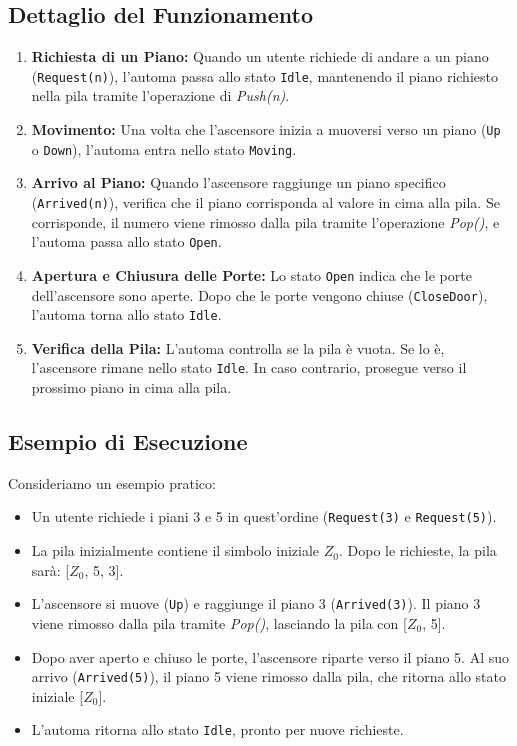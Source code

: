 \documentclass[a4paper,12pt]{report}
\begin{document}
\subsection*{Dettaglio del Funzionamento}
\begin{enumerate}
    \item \textbf{Richiesta di un Piano:} Quando un utente richiede di andare a un piano (\texttt{Request(n)}), l'automa passa allo stato \texttt{Idle}, mantenendo il piano richiesto nella pila tramite l'operazione di \textit{Push(n)}.
    \item \textbf{Movimento:} Una volta che l'ascensore inizia a muoversi verso un piano (\texttt{Up} o \texttt{Down}), l'automa entra nello stato \texttt{Moving}.
    \item \textbf{Arrivo al Piano:} Quando l'ascensore raggiunge un piano specifico (\texttt{Arrived(n)}), verifica che il piano corrisponda al valore in cima alla pila. Se corrisponde, il numero viene rimosso dalla pila tramite l'operazione \textit{Pop()}, e l'automa passa allo stato \texttt{Open}.
    \item \textbf{Apertura e Chiusura delle Porte:} Lo stato \texttt{Open} indica che le porte dell'ascensore sono aperte. Dopo che le porte vengono chiuse (\texttt{CloseDoor}), l'automa torna allo stato \texttt{Idle}.
    \item \textbf{Verifica della Pila:} L'automa controlla se la pila è vuota. Se lo è, l'ascensore rimane nello stato \texttt{Idle}. In caso contrario, prosegue verso il prossimo piano in cima alla pila.
\end{enumerate}

\subsection*{Esempio di Esecuzione}
Consideriamo un esempio pratico:
\begin{itemize}
    \item Un utente richiede i piani 3 e 5 in quest'ordine (\texttt{Request(3)} e \texttt{Request(5)}).
    \item La pila inizialmente contiene il simbolo iniziale $Z_0$. Dopo le richieste, la pila sarà: [$Z_0$, 5, 3].
    \item L'ascensore si muove (\texttt{Up}) e raggiunge il piano 3 (\texttt{Arrived(3)}). Il piano 3 viene rimosso dalla pila tramite \textit{Pop()}, lasciando la pila con [$Z_0$, 5].
    \item Dopo aver aperto e chiuso le porte, l'ascensore riparte verso il piano 5. Al suo arrivo (\texttt{Arrived(5)}), il piano 5 viene rimosso dalla pila, che ritorna allo stato iniziale [$Z_0$].
    \item L'automa ritorna allo stato \texttt{Idle}, pronto per nuove richieste.
\end{itemize}
\end{document}
